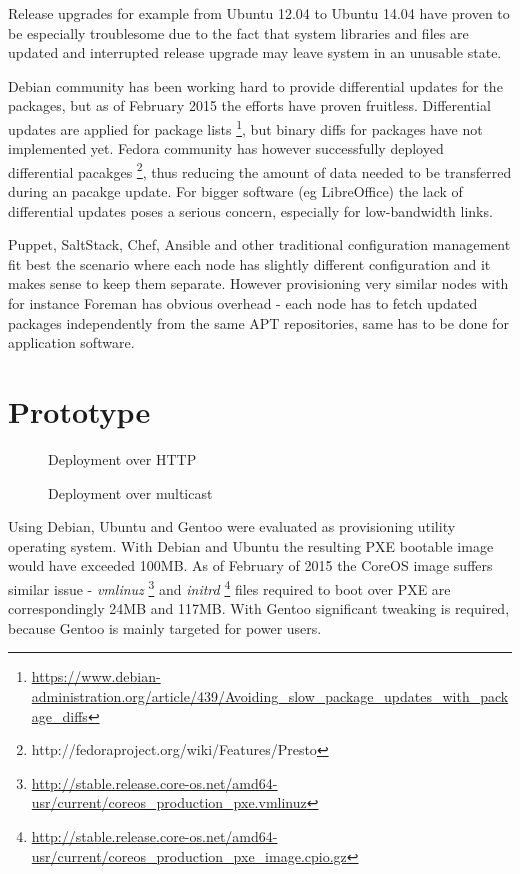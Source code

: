 \documentclass{article}
\begin{document}
Release upgrades for example from Ubuntu 12.04 to Ubuntu 14.04
have proven to be especially troublesome due to the fact that system libraries
and files are updated and interrupted release upgrade may leave system
in an unusable state.

Debian community has been working hard to provide differential updates for
the packages, but as of February 2015 the efforts have proven fruitless.
Differential updates are applied for package lists
\footnote{\url{https://www.debian-administration.org/article/439/Avoiding_slow_package_updates_with_package_diffs}},
but binary diffs for packages have not implemented yet.
Fedora community has however successfully deployed differential pacakges
\footnote{http://fedoraproject.org/wiki/Features/Presto},
thus reducing the amount of data needed to be transferred during an pacakge update. For bigger software (eg LibreOffice) the lack of differential updates poses a serious concern, especially for low-bandwidth links.

Puppet, SaltStack, Chef, Ansible and other traditional configuration management
fit best the scenario where each node has slightly different configuration and
it makes sense to keep them separate. However provisioning very similar nodes
with for instance Foreman has obvious overhead - each node has to fetch updated
packages independently from the same APT repositories, same has to be done for
application software.

\chapter{Prototype}


\begin{figure}[!htb]
\centering
\scalebox{0.5}{}
\caption{Deployment over HTTP}
\label{fig:digraph}
\end{figure}


\begin{figure}[!htb]
\centering
\scalebox{0.5}{}
\caption{Deployment over multicast}
\label{fig:digraph}
\end{figure}




Using Debian, Ubuntu and Gentoo were evaluated as provisioning utility
operating system. With Debian and Ubuntu the resulting PXE bootable image
would have exceeded 100MB.
As of February of 2015 the CoreOS image suffers similar issue -
\emph{vmlinuz}
\footnote{\url{http://stable.release.core-os.net/amd64-usr/current/coreos_production_pxe.vmlinuz}}
and
\emph{initrd}
\footnote{\url{http://stable.release.core-os.net/amd64-usr/current/coreos_production_pxe_image.cpio.gz}}
files required to boot over PXE are correspondingly 24MB and 117MB.
With Gentoo significant tweaking is required, because Gentoo is
mainly targeted for power users.
\end{document}

